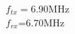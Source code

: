 \documentclass[preview]{standalone}
\begin{document}
\begin{center}
$f_{tx}=$6.90MHz\\$f_{rx}$=6.70MHz
\end{center}
\end{document}

